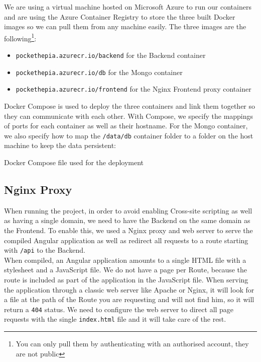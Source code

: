 \documentclass[twoside, openright,11pt,a4paper]{book}
\newenvironment{code}{\captionsetup{type=listing}}{}
\begin{document}
We are using a virtual machine hosted on Microsoft Azure to run our containers and are using the Azure Container Registry to store the three built Docker images so we can pull them from any machine easily. The three images are the following\footnote{You can only pull them by authenticating with an authorised account, they are not public}:
\begin{itemize}
	\item \verb+pockethepia.azurecr.io/backend+ for the Backend container
	\item \verb+pockethepia.azurecr.io/db+ for the Mongo container
	\item \verb+pockethepia.azurecr.io/frontend+ for the Nginx Frontend proxy container
\end{itemize}

Docker Compose is used to deploy the three containers and link them together so they can communicate with each other. With Compose, we specify the mappings of ports for each container as well as their hostname. For the Mongo container, we also specify how to map the \verb+/data/db+ container folder to a folder on the host machine to keep the data persistent:
\begin{code}
	\caption{Docker Compose file used for the deployment}
\end{code}

\subsection{Nginx Proxy}
\label{nginx_proxy}
When running the project, in order to avoid enabling Cross-site scripting as well as having a single domain, we need to have the Backend on the same domain as the Frontend. To enable this, we used a Nginx\cite{nginx:website} proxy and web server to serve the compiled Angular application as well as redirect all requests to a route starting with \verb+/api+ to the Backend. \\

When compiled, an Angular application amounts to a single HTML file with a stylesheet and a JavaScript file. We do not have a page per Route, because the route is included as part of the application in the JavaScript file. When serving the application through a classic web server like Apache\cite{apache:website} or Nginx, it will look for a file at the path of the Route you are requesting and will not find him, so it will return a \verb+404+\cite{mdn:status:404} status. We need to configure the web server to direct all page requests with the single \verb+index.html+ file and it will take care of the rest. \\
\end{document}
